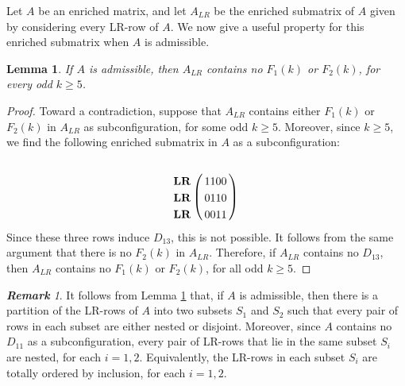 \documentclass[12pt]{book}
\theoremstyle{plain}
\newtheorem{lema}[teo]{Lemma}
\theoremstyle{remark}
\newtheorem{remark}[teo]{\textbf{\textit{Remark}}}
\newcommand*{\tagg}{\mathrm{tag}}%
\begin{document}

Let $A$ be an enriched matrix, and let $A_{LR}$ be the enriched submatrix of $A$ given by considering every LR-row of $A$. We now give a useful property for this enriched submatrix when $A$ is admissible.

\begin{lema} \label{lema:A_LR_2nested}
If $A$ is admissible, then $A_{LR}$ contains no $F_1(k)$ or $F_2(k)$, for every odd $k \geq 5$.
\end{lema} 

\begin{proof}
Toward a contradiction, suppose that $A_{LR}$ contains either $F_1(k)$ or $F_2(k)$ in $A_{LR}$  as subconfiguration, for some odd $k \geq 5$. Moreover, since $k\geq5$, we find the following enriched submatrix in $A$ as a subconfiguration:
\begin{align*}
	\bordermatrix{ & \cr
		\textbf{LR} & 1 1 0 0 \cr
		\textbf{LR} & 0 1 1 0 \cr
		\textbf{LR} & 0 0 1 1 }\
\end{align*}
Since these three rows induce $D_{13}$, this is not possible. 
It follows from the same argument that there is no $F_2(k)$ in $A_{LR}$. %
Therefore, if $A_{LR}$ contains no $D_{13}$, then $A_{LR}$ contains no $F_1(k)$ or $F_2(k)$, for all odd $k \geq 5$. 

\end{proof}


\begin{remark}
	It follows from Lemma \ref{lema:A_LR_2nested} that, if $A$ is admissible, then there is a partition of the LR-rows of $A$ into two subsets $S_1$ and $S_2$ such that every pair of rows in each subset are either nested or disjoint. Moreover, since $A$ contains no $D_{11}$ as a subconfiguration, every pair of LR-rows that lie in the same subset $S_i$ are nested, for each $i=1,2$. Equivalently, the LR-rows in each subset $S_i$ are totally ordered by inclusion, for each $i=1,2$.
\end{remark} \label{rem:A_LR_2nested}
	 
\end{document}
